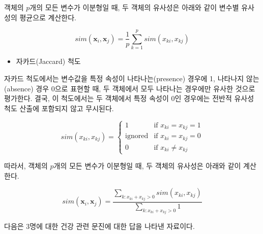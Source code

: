 \documentclass[
]{book}
\providecommand{\tightlist}{%
  \setlength{\itemsep}{0pt}\setlength{\parskip}{0pt}}
\begin{document}
객체의 \(p\)개의 모든 변수가 이분형일 때, 두 객체의 유사성은 아래와 같이 변수별 유사성의 평균으로 계산한다.

\begin{equation*}
sim(\mathbf{x}_i, \mathbf{x}_j) = \frac{1}{p} \sum_{k = 1}^{p} sim(x_{ki}, x_{kj})
\end{equation*}

\begin{itemize}
\tightlist
\item
  자카드(Jaccard) 척도
\end{itemize}

자카드 척도에서는 변수값을 특정 속성이 나타나는(presence) 경우에 1, 나타나지 않는(absence) 경우 0으로 표현할 때, 두 객체에서 모두 나타나는 경우에만 유사한 것으로 평가한다. 결국, 이 척도에서는 두 객체에서 특정 속성이 0인 경우에는 전반적 유사성 척도 산출에 포함되지 않고 무시된다.

\begin{equation*}
sim(x_{ki}, x_{kj}) = \begin{cases}
1 & \text{if } x_{ki} = x_{kj} = 1\\
\text{ignored} & \text{if } x_{ki} = x_{kj} = 0\\
0 & \text{if } x_{ki} \neq x_{kj}
\end{cases}
\end{equation*}

따라서, 객체의 \(p\)개의 모든 변수가 이분형일 때, 두 객체의 유사성은 아래와 같이 계산한다.

\begin{equation*}
sim(\mathbf{x}_i, \mathbf{x}_j) = \frac{\sum_{k: x_{ki} + x_{kj} > 0} sim(x_{ki}, x_{kj})}{\sum_{k: x_{ki} + x_{kj} > 0} 1}
\end{equation*}

다음은 3명에 대한 건강 관련 문진에 대한 답을 나타낸 자료이다.
\end{document}
